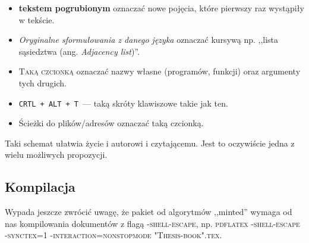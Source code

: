 \begin{itemize}
	\item \textbf{tekstem pogrubionym} oznaczać nowe pojęcia, które pierwszy raz wystąpiły w tekście.
	\item \textit{Oryginalne sformułowania z danego języka} oznaczać kursywą np. ,,lista sąsiedztwa (ang. \textit{Adjacency list})''.
	\item \textsc{Taką czcionką} oznaczać nazwy własne (programów, funkcji) oraz argumenty tych drugich.
	\item  \texttt{CRTL + ALT + T}~--- taką skróty klawiszowe takie jak ten.
	\item \textsf{Ścieżki do plików/adresów} oznaczać taką czcionką.
\end{itemize}

Taki schemat ułatwia życie i autorowi i czytającemu.
Jest to oczywiście jedna z wielu możliwych propozycji.

\subsection{Kompilacja}

Wypada jeszcze zwrócić uwagę, że pakiet od algorytmów ,,minted'' wymaga od nas kompilowania dokumentów z flagą \textsc{-shell-escape}, np. \textsc{pdflatex -shell-escape -synctex=1 -interaction=nonstopmode "Thesis-book".tex}.